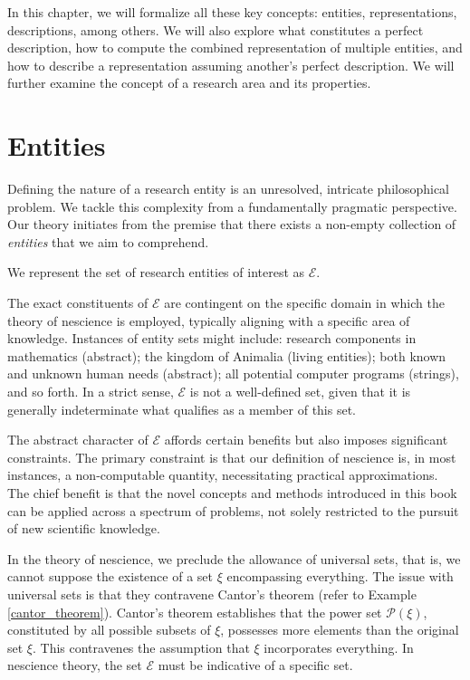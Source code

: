 In this chapter, we will formalize all these key concepts: entities, representations, descriptions, among others. We will also explore what constitutes a perfect description, how to compute the combined representation of multiple entities, and how to describe a representation assuming another's perfect description. We will further examine the concept of a research area and its properties.

%
%

\section{Entities}
\label{sec:descriptions_entities}

Defining the nature of a research entity is an unresolved, intricate philosophical problem. We tackle this complexity from a fundamentally pragmatic perspective. Our theory initiates from the premise that there exists a non-empty collection of \emph{entities} that we aim to comprehend.

\begin{notation}
We represent the set of research entities of interest as $\mathcal{E}$.
\end{notation}

The exact constituents of $\mathcal{E}$ are contingent on the specific domain in which the theory of nescience is employed, typically aligning with a specific area of knowledge. Instances of entity sets might include: research components in mathematics (abstract); the kingdom of Animalia (living entities); both known and unknown human needs (abstract); all potential computer programs (strings), and so forth. In a strict sense, $\mathcal{E}$ is not a well-defined set, given that it is generally indeterminate what qualifies as a member of this set.

The abstract character of $\mathcal{E}$ affords certain benefits but also imposes significant constraints. The primary constraint is that our definition of nescience is, in most instances, a non-computable quantity, necessitating practical approximations. The chief benefit is that the novel concepts and methods introduced in this book can be applied across a spectrum of problems, not solely restricted to the pursuit of new scientific knowledge.

In the theory of nescience, we preclude the allowance of universal sets, that is, we cannot suppose the existence of a set $\xi$ encompassing everything. The issue with universal sets is that they contravene Cantor's theorem (refer to Example \ref{cantor_theorem}). Cantor's theorem establishes that the power set $\mathcal{P}(\xi)$, constituted by all possible subsets of $\xi$, possesses more elements than the original set $\xi$. This contravenes the assumption that $\xi$ incorporates everything. In nescience theory, the set $\mathcal{E}$ must be indicative of a specific set.

